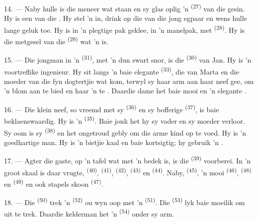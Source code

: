14. --- Naby hulle is die meneer wat staan en sy glas oplig 'n 
\textsuperscript{(27)} van die gesin. Hy is een van die . Hy stel 'n  in, drink op die  van die
jong egpaar en wens hulle lange geluk toe. Hy is in 'n plegtige pak geklee, in 'n
manelpak, met  \textsuperscript{(28)}. Hy is die metgesel van
die  \textsuperscript{(29)} wat 'n  is.

15. --- Die jongman in 'n  \textsuperscript{(31)}, met 'n dun swart
snor, is die  \textsuperscript{(30)} van Jan. Hy is 'n voortreflike
ingenieur. Hy sit langs 'n baie elegante  \textsuperscript{(33)}, die
 van Marta en die moeder van die fyn dogtertjie wat kom, terwyl sy
haar arm aan haar neef gee, om 'n blom aan te bied en haar 'n  te
. Daardie dame het baie mooi  en 'n elegante
.

16. --- Die klein neef, so vreemd met sy  \textsuperscript{(36)} en sy
bofferige  \textsuperscript{(37)}, is baie beklaenswaardig. Hy is 'n
 \textsuperscript{(35)}. Baie jonk het hy sy vader en sy moeder verloor.
Sy oom is sy  \textsuperscript{(38)} en het ongetroud gebly om die arme kind
op te voed. Hy is 'n goedhartige man. Hy is 'n bietjie kaal en baie kortsigtig; hy
gebruik 'n .

\VUsaut{2.4mm}
\VUsaut{3.0mm}

17. --- Agter die gaste, op 'n tafel wat met 'n  bedek is, is die
 \textsuperscript{(39)} voorberei. In 'n groot skaal is daar vrugte,
 \textsuperscript{(40)},  \textsuperscript{(41)},
 \textsuperscript{(42)},  \textsuperscript{(43)} en
 \textsuperscript{(44)}. Naby, 
\textsuperscript{(45)}, 'n mooi  \textsuperscript{(46)},
 \textsuperscript{(48)} en 
\textsuperscript{(49)} en ook stapels skoon  \textsuperscript{(47)}.

18. --- Die  \textsuperscript{(50)} trek 'n 
\textsuperscript{(52)} ou wyn oop met 'n  \textsuperscript{(51)}.
Die  \textsuperscript{(53)} lyk baie moeilik om uit te trek. Daardie
kelderman het 'n  \textsuperscript{(54)} onder sy arm.

